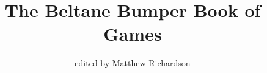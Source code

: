 


\documentclass[12pt,a4paper,titlepage,twoside,openright]{book}
\usepackage[latin1]{inputenc}
\usepackage{amsmath}
\usepackage{amsfonts}
\usepackage{amssymb}
\usepackage{multind}
\usepackage{fullpage}
\usepackage{verbatim}
\author{edited by Matthew Richardson}
\title{The Beltane Bumper Book of Games}
\date{}

\newcommand{\gamename}{}

\newcommand{\refer}[1]{\\*See also: \textbf{#1} (p.\pageref{#1})}

\makeatletter
\newcommand{\game}[2]{
\renewcommand{\gamename}{#1}
\@for \xx:=#2\do{
\index{Index}{\xx!{#1}}
}
\label{#1}
\section[#1]{#1}
\setlength{\parindent}{1.1em}
\textbf{Categories:}\indent #2\\*
\setlength{\parindent}{0em}
}
\makeatother


\makeatletter
\newcommand{\aka}[1]{
\@for \xy:=#1\do{
\index{Alternatives}{\xy!\gamename}
\textbf{Also Known As:} \xy\\*
}
}
\makeatother

\makeatletter
\newcommand{\equip}[1]{
\setlength{\parindent}{2.15em}
\textbf{Equipment:}
\@for \xy:=#1\do{
\xy\\*\indent\indent\indent
}
\setlength{\parindent}{0em}
}
\makeatother

\newcommand{\play}[1]{
\setlength{\parindent}{2.5em}
\textbf{Players:\indent} {#1}\\*
\setlength{\parindent}{0em}
}




